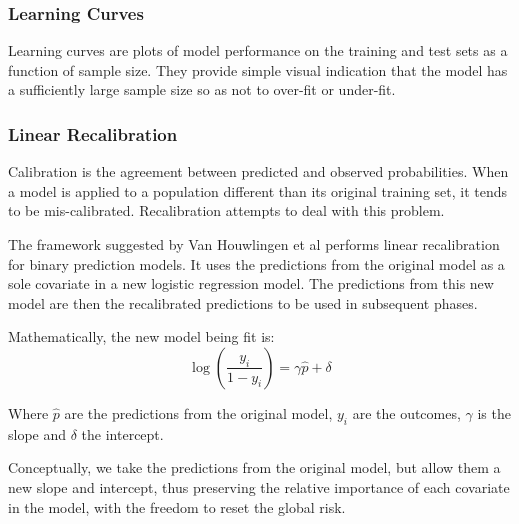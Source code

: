 \documentclass[a4paper,12pt]{article}
\begin{document}
		\subsubsection{Learning Curves}
		Learning curves are plots of model performance on the training and test sets as a function of sample size. They provide simple visual indication that the model has a sufficiently large sample size so as not to over-fit or under-fit.
		
		\subsubsection{Linear Recalibration}
		Calibration is the agreement between predicted and observed probabilities. When a model is applied to a population different than its original training set, it tends to be mis-calibrated. Recalibration attempts to deal with this problem.
		
		The framework suggested by Van Houwlingen et al\cite{Houwelingen2000} performs linear recalibration for binary prediction models. It uses the predictions from the original model as a sole covariate in a new logistic regression model. The predictions from this new model are then the recalibrated predictions to be used in subsequent phases.
				
		Mathematically, the new model being fit is:
		\begin{equation*}
		\log(\frac{y_i}{1-y_i}) = \gamma \hat{p} + \delta
		\end{equation*}
		
		Where $ \hat{p} $ are the predictions from the original model, $ y_i $ are the outcomes, $ \gamma $ is the slope and $ \delta $ the intercept.
		
		Conceptually, we take the predictions from the original model, but allow them a new slope and intercept, thus preserving the relative importance of each covariate in the model, with the freedom to reset the global risk.
		
\end{document}
